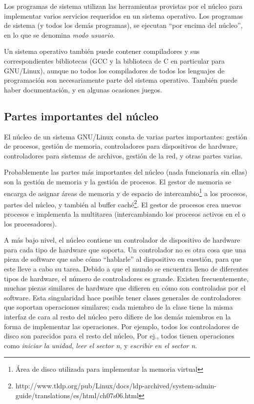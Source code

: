 \documentclass[12pt]{article}
\begin{document}
Los programas de sistema utilizan las herramientas provistas por el
núcleo para implementar varios servicios requeridos en un sistema 
operativo. Los programas de sistema (y todos los demás programas), se 
ejecutan ``por encima del núcleo'', en lo que se denomina 
\textit{modo usuario}. 

Un sistema operativo también puede contener compiladores y sus
correspondientes bibliotecas (GCC y la biblioteca de C en particular para
GNU/Linux), aunque no todos los compiladores de todos los lenguajes de
programación son necesariamente parte del sistema operativo. También 
puede haber documentación, y en algunas ocasiones juegos. 

\subsection{Partes importantes del núcleo}

El núcleo de un sistema GNU/Linux consta de varias partes importantes:
gestión de procesos, gestión de memoria,  controladores para 
dispositivos de hardware, controladores para sistemas de archivos, 
gestión de la red, y otras partes varias. 

 Probablemente las partes más importantes del núcleo (nada funcionaría sin
ellas) son la gestión de memoria y la gestión de procesos. El gestor de 
memoria se encarga de asignar áreas de memoria y de espacio de 
intercambio\footnote{Área de disco utilizada para implementar la memoria 
virtual} a los procesos, partes del núcleo, y también al buffer caché\footnote{http://www.tldp.org/pub/Linux/docs/ldp-archived/system-admin-guide/translations/es/html/ch07s06.html}. El gestor de procesos crea nuevos 
procesos e implementa la multitarea (intercambiando los procesos activos 
en el o los procesadores).

A más bajo nivel, el núcleo contiene un controlador de dispositivo de
hardware para cada tipo de hardware que soporta. Un controlador no es otra
cosa que una pieza de software que sabe cómo ``hablarle'' al dispositivo en
cuestión, para que este lleve a cabo su tarea. Debido a que el mundo se
encuentra lleno de diferentes tipos de hardware, el número de 
controladores es grande. Existen frecuentemente, muchas piezas similares 
de hardware que difieren en cómo son controladas por el software. Esta 
singularidad hace posible tener clases generales de controladores que 
soportan operaciones similares; cada miembro de la clase tiene la misma 
interfaz de cara al resto del núcleo pero difiere de los demás miembros 
en la forma de implementar las operaciones. Por
ejemplo, todos los controladores de disco son parecidos para el resto del
núcleo, Por ej., todos tienen operaciones como \textit{iniciar la unidad},
\textit{leer el sector n}, y \textit{escribir en el sector n}.
\end{document}
